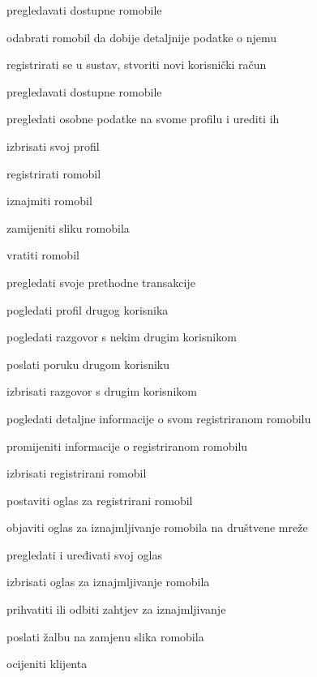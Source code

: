 			
			\begin{packed_enum}
				\item  {}
				
				\begin{packed_enum}
					
					\item pregledavati dostupne romobile
					\item odabrati romobil da dobije detaljnije podatke o njemu
					\item registrirati se u sustav, stvoriti novi korisnički račun
					
					
				\end{packed_enum}
			
				\item  {}
				
				\begin{packed_enum}
					\item pregledavati dostupne romobile
					\item pregledati osobne podatke na svome profilu i urediti ih 
					\item izbrisati svoj profil
					\item registrirati romobil
					\item iznajmiti romobil
					\item zamijeniti sliku romobila
					\item vratiti romobil
					\item pregledati svoje prethodne transakcije
					\item pogledati profil drugog korisnika
					\item pogledati razgovor s nekim drugim korisnikom
					\item poslati poruku drugom korisniku
					\item izbrisati razgovor s drugim korisnikom
					
				
					
				\end{packed_enum}
				\item  {}
				
				\begin{packed_enum}
				\item pogledati detaljne informacije o svom registriranom romobilu
				\item promijeniti informacije o registriranom romobilu
				\item izbrisati registrirani romobil
				\item postaviti oglas za registrirani romobil
				\item objaviti oglas za iznajmljivanje romobila na društvene mreže
				\item pregledati i uređivati svoj oglas
				\item izbrisati oglas za iznajmljivanje romobila
				\item prihvatiti ili odbiti zahtjev za iznajmljivanje
				\item poslati žalbu na zamjenu slika romobila 
				\item ocijeniti klijenta


\end{packed_enum}
\end{packed_enum}
